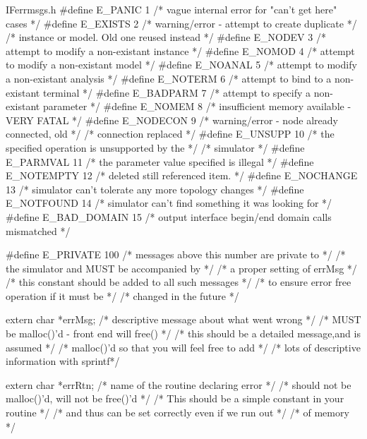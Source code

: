 {{{{{{IFerrmsgs.h
#define E_PANIC 1       /* vague internal error for "can't get here" cases */
#define E_EXISTS 2      /* warning/error - attempt to create duplicate */
                        /* instance or model. Old one reused instead */
#define E_NODEV 3       /* attempt to modify a non-existant instance */
#define E_NOMOD 4       /* attempt to modify a non-existant model */
#define E_NOANAL 5      /* attempt to modify a non-existant analysis */
#define E_NOTERM 6      /* attempt to bind to a non-existant terminal */
#define E_BADPARM 7     /* attempt to specify a non-existant parameter */
#define E_NOMEM 8       /* insufficient memory available - VERY FATAL */
#define E_NODECON 9     /* warning/error - node already connected, old */
                        /* connection replaced */
#define E_UNSUPP 10     /* the specified operation is unsupported by the */
                        /* simulator */
#define E_PARMVAL 11    /* the parameter value specified is illegal */
#define E_NOTEMPTY 12   /* deleted still referenced item. */
#define E_NOCHANGE 13   /* simulator can't tolerate any more topology changes */
#define E_NOTFOUND 14   /* simulator can't find something it was looking for */
#define E_BAD_DOMAIN 15 /* output interface begin/end domain calls mismatched */

#define E_PRIVATE 100   /* messages above this number are private to */
                        /* the simulator and MUST be accompanied by */
                        /* a proper setting of errMsg */
                        /* this constant should be added to all such messages */
                        /* to ensure error free operation if it must be */
                        /* changed in the future */

extern char *errMsg;    /* descriptive message about what went wrong */
                        /* MUST be malloc()'d - front end will free() */
                        /* this should be a detailed message,and is assumed */
                        /* malloc()'d so that you will feel free to add */
                        /* lots of descriptive information with sprintf*/

extern char *errRtn;    /* name of the routine declaring error */
                        /* should not be malloc()'d, will not be free()'d */
                        /* This should be a simple constant in your routine */
                        /* and thus can be set correctly even if we run out */
                        /* of memory */



}}}}}}
